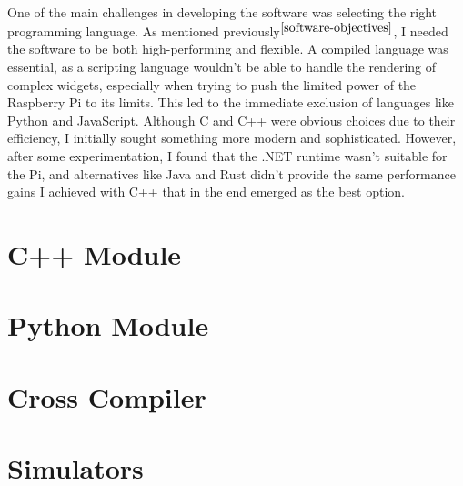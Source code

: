 One of the main challenges in developing the software was selecting the right programming language. As mentioned previously$^{\ref{software-objectives}}$, I needed the software to be both high-performing and flexible. A compiled language was essential, as a scripting language wouldn’t be able to handle the rendering of complex widgets, especially when trying to push the limited power of the Raspberry Pi to its limits. This led to the immediate exclusion of languages like Python and JavaScript. Although C and C++ were obvious choices due to their efficiency, I initially sought something more modern and sophisticated. However, after some experimentation, I found that the .NET runtime wasn’t suitable for the Pi, and alternatives like Java and Rust didn’t provide the same performance gains I achieved with C++ that in the end emerged as the best option.

\section{C++ Module}

\newpage
\section{Python Module}

\newpage
\section{Cross Compiler}

\newpage
\section{Simulators}
\label{simulators}


